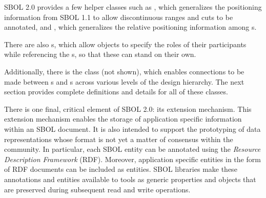SBOL 2.0 provides a few helper classes such as , which generalizes the positioning information from SBOL 1.1 to allow discontinuous ranges and cuts to be annotated, and , which generalizes the relative positioning information among s.  

There are also 
s, which allow  objects to specify the roles of their participants while referencing the s, so that these can stand on their own.

Additionally, there is the  class (not shown), which enables connections to be made between s and s across various levels of the design hierarchy.  The next section provides complete definitions and details for all of these classes.

There is one final, critical element of SBOL 2.0: its extension mechanism. This extension mechanism enables the storage of application specific information within an SBOL document. It is also intended to support the prototyping of data representations whose format is not yet a matter of consensus within the community. In particular, each SBOL entity can be annotated using the \emph{Resource Description Framework} (RDF). Moreover, application specific entities in the form of RDF documents can be included as  entities. SBOL libraries make these annotations and entities available to tools as generic properties and objects that are preserved during subsequent read and write operations.

